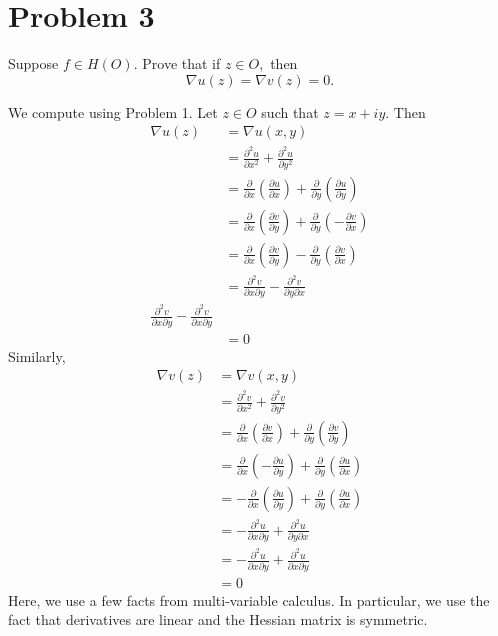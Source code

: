 \documentclass[11pt]{article}
\begin{document}
\section*{Problem 3}
\begin{problem}
    Suppose $f \in H(O).$ Prove that if $z\in O,$ then
    \[\nabla  u(z) = \nabla v(z) = 0.\]
\end{problem}
\begin{solution}
    We compute using Problem 1. Let $z\in O$ such that $z = x + iy.$ Then
    \begin{align*}
        \nabla  u(z)  &= \nabla u(x,y)\\
        &= \frac{\partial^2 u}{\partial x^2} + \frac{\partial ^2 u}{\partial y^2}\\
        &= \frac{\partial}{\partial x}(\frac{\partial u}{\partial x}) + \frac{\partial}{\partial y}(\frac{\partial u}{\partial y})\\
        &= \frac{\partial}{\partial x}(\frac{\partial v}{\partial y}) + \frac{\partial}{\partial y}(-\frac{\partial v}{\partial x})\\
        &= \frac{\partial}{\partial x}(\frac{\partial v}{\partial y}) - \frac{\partial}{\partial y}(\frac{\partial v}{\partial x})\\
        &= \frac{\partial^2 v}{\partial x \partial y} - \frac{\partial^2 v}{\partial y\partial x}\\
        \frac{\partial^2 v}{\partial x \partial y} - \frac{\partial^2 v}{\partial x\partial y}\\
        &= 0
    \end{align*}
    Similarly,
    \begin{align*}
        \nabla  v(z)  &= \nabla v(x,y)\\
        &= \frac{\partial^2 v}{\partial x^2} + \frac{\partial ^2 v}{\partial y^2}\\
        &= \frac{\partial}{\partial x}(\frac{\partial v}{\partial x}) + \frac{\partial}{\partial y}(\frac{\partial v}{\partial y})\\
        &= \frac{\partial}{\partial x}(-\frac{\partial u}{\partial y}) + \frac{\partial}{\partial y}(\frac{\partial u}{\partial x})\\
        &= -\frac{\partial}{\partial x}(\frac{\partial u}{\partial y}) + \frac{\partial}{\partial y}(\frac{\partial u}{\partial x})\\
        &=-\frac{\partial^2 u}{\partial x\partial y} + \frac{\partial^2 u}{\partial y\partial x}\\
        &= -\frac{\partial^2 u}{\partial x\partial y} + \frac{\partial^2 u}{\partial x\partial y}\\
        &= 0
    \end{align*}
Here, we use a few facts from multi-variable calculus. In particular, we use the fact that derivatives are linear and the Hessian matrix is symmetric.
\end{solution}
\end{document}
